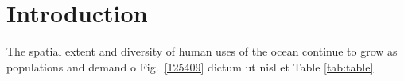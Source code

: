\section{Introduction}
\label{introduction}

The spatial extent and diversity of human uses of the ocean continue to grow as populations and demand o Fig.~\ref{125409} dictum ut nisl et Table \ref{tab:table}
